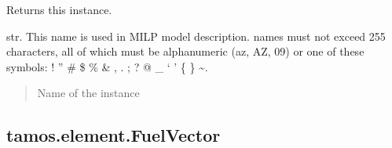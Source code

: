 \documentclass[letterpaper,10pt,english]{sphinxmanual}
\begin{document}
\begin{fulllineitems}
\begin{fulllineitems}
\label{\detokenize{generated/tamos.element.ElectricityVector:tamos.element.ElectricityVector.get_vectors}}
\pysigstartsignatures
{}
\pysigstopsignatures
\sphinxAtStartPar
Returns this instance.

\end{fulllineitems}


\begin{fulllineitems}
\label{\detokenize{generated/tamos.element.ElectricityVector:tamos.element.ElectricityVector.name}}
\pysigstartsignatures
{}
\pysigstopsignatures
\sphinxAtStartPar
str.
This name is used in MILP model description.
names must not exceed 255 characters,
all of which must be alphanumeric (a\sphinxhyphen{}z, A\sphinxhyphen{}Z, 0\sphinxhyphen{}9) or one of these symbols:
! ” \# \$ \% \& , . ; ? @ \_ ‘ ’ \{ \} \textasciitilde{}.
\begin{quote}\begin{description}
\sphinxAtStartPar
Name of the instance

\end{description}\end{quote}

\end{fulllineitems}


\end{fulllineitems}


\sphinxstepscope


\subsection{tamos.element.FuelVector}
\label{\detokenize{generated/tamos.element.FuelVector:tamos-element-fuelvector}}\label{\detokenize{generated/tamos.element.FuelVector::doc}}
\end{document}
